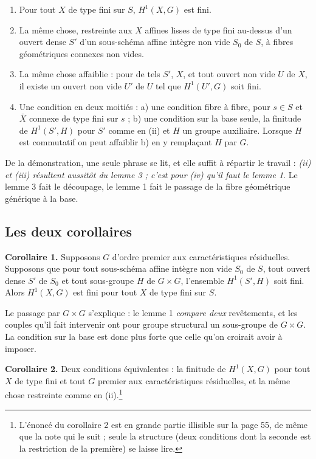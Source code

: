 \documentclass[11pt,a4paper]{article}
\begin{document}
\begin{enumerate}
  \item[(i)] Pour tout $X$ de type fini sur $S$, $H^{1}(X, G)$ est fini.
  \item[(ii)] La même chose, restreinte aux $X$ affines lisses de type fini
    au-dessus d'un ouvert dense $S'$ d'un sous-schéma affine intègre non vide
    $S_{0}$ de $S$, à fibres géométriques connexes non vides.
  \item[(iii)] La même chose affaiblie : pour de tels $S'$, $X$, et tout ouvert
    non vide $U$ de $X$, il existe un ouvert non vide $U'$ de $U$ tel que
    $H^{1}(U', G)$ soit fini.
  \item[(iv)] Une condition en deux moitiés : a) une condition fibre à fibre,
    pour $s \in S$ et $\bar{X}$ connexe de type fini sur $s$ ; b) une condition
    sur la base seule, la finitude de $H^{1}(S', H)$ pour $S'$ comme en (ii) et
    $H$ un groupe auxiliaire. Lorsque $H$ est commutatif on peut affaiblir b)
    en y remplaçant $H$ par $G$.
\end{enumerate}

De la démonstration, une seule phrase se lit, et elle suffit à répartir le
travail : \emph{(ii) et (iii) résultent aussitôt du lemme 3 ; c'est pour (iv)
qu'il faut le lemme 1}. Le lemme 3 fait le découpage, le lemme 1 fait le
passage de la fibre géométrique générique à la base.

\subsection*{Les deux corollaires}

\textbf{Corollaire 1.} Supposons $G$ d'ordre premier aux caractéristiques
résiduelles. Supposons que pour tout sous-schéma affine intègre non vide
$S_{0}$ de $S$, tout ouvert dense $S'$ de $S_{0}$ et tout sous-groupe $H$ de
$G \times G$, l'ensemble $H^{1}(S', H)$ soit fini. Alors $H^{1}(X, G)$ est fini
pour tout $X$ de type fini sur $S$.

Le passage par $G \times G$ s'explique : le lemme 1
\emph{compare deux} revêtements, et les couples qu'il fait intervenir ont pour
groupe structural un sous-groupe de $G \times G$. La condition sur la base est
donc plus forte que celle qu'on croirait avoir à imposer.

\textbf{Corollaire 2.} Deux conditions équivalentes : la finitude de
$H^{1}(X, G)$ pour tout $X$ de type fini et tout $G$ premier aux
caractéristiques résiduelles, et la même chose restreinte comme en
(ii).\footnote{L'énoncé du corollaire 2 est en grande partie illisible sur la
page 55, de même que la note qui le suit ; seule la structure (deux
conditions dont la seconde est la restriction de la première) se laisse
lire.}
\end{document}

